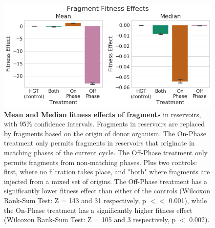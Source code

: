 \documentclass[PhD]{msu-thesis}
\begin{document}
	\begin{figure}[h!]
	\begin{center}
	\includegraphics[width=0.95\columnwidth]{figures/HGT/fitness_effect_by_cycle_phase_source.png}
	\caption{\textbf{Mean and Median fitness effects of fragments} in reservoirs, with 95\% confidence intervals. Fragments in reservoirs are replaced by fragments based on the origin of donor organism. The On-Phase treatment only permits fragments in reservoirs that originate in matching phases of the current cycle. The Off-Phase treatment only permits fragments from non-matching phases. Plus two controls: first, where no filtration takes place, and "both" where fragments are injected from a mixed set of origins. The Off-Phase treatment has a significantly lower fitness effect than either of the controls (Wilcoxon Rank-Sum Test: Z = 143 and 31 respectively, p $<<$ 0.001), while the On-Phase treatment has a significantly higher fitness effect (Wilcoxon Rank-Sum Test: Z = 105 and 3 respectively, p $<$ 0.002). 
	}\label{fig:fitness_effect_by_cycle_phase_source}
	\end{center}
	\end{figure}
\end{document}
